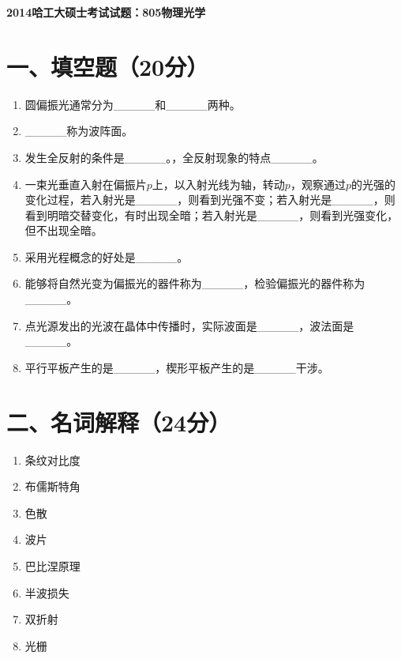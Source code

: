 \documentclass[12pt, a4paper]{article}
\theoremstyle{solution}
\begin{document}
\begin{center}
\Large\textbf{2014哈工大硕士考试试题：805物理光学}
\end{center}





\section*{一、填空题（20分）}
\begin{enumerate}
    \item 圆偏振光通常分为\_\_\_\_\_和\_\_\_\_\_两种。
    \item \_\_\_\_\_称为波阵面。
    \item 发生全反射的条件是\_\_\_\_\_。，全反射现象的特点\_\_\_\_\_。
    \item 一束光垂直入射在偏振片$p$上，以入射光线为轴，转动$p$，观察通过$p$的光强的变化过程，若入射光是\_\_\_\_\_，则看到光强不变；若入射光是\_\_\_\_\_，则看到明暗交替变化，有时出现全暗；若入射光是\_\_\_\_\_，则看到光强变化，但不出现全暗。
    \item 采用光程概念的好处是\_\_\_\_\_。
    \item 能够将自然光变为偏振光的器件称为\_\_\_\_\_，检验偏振光的器件称为\_\_\_\_\_。
    \item 点光源发出的光波在晶体中传播时，实际波面是\_\_\_\_\_，波法面是\_\_\_\_\_。
    \item 平行平板产生的是\_\_\_\_\_，楔形平板产生的是\_\_\_\_\_干涉。
\end{enumerate}
\section*{二、名词解释（24分）}
\begin{enumerate}
    \item 条纹对比度
    \item 布儒斯特角
    \item 色散
    \item 波片
    \item 巴比涅原理
    \item 半波损失
    \item 双折射
    \item 光栅
\end{enumerate}
\end{document}
